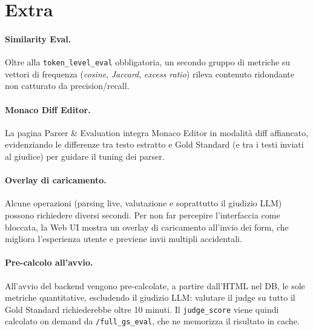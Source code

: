 \documentclass[11pt]{article}
\begin{document}

\section*{Extra}

\paragraph{Similarity Eval.} Oltre alla \texttt{token\_level\_eval} obbligatoria, un secondo gruppo di metriche su vettori di frequenza (\emph{cosine}, \emph{Jaccard}, \emph{excess ratio}) rileva contenuto ridondante non catturato da precision/recall.

\paragraph{Monaco Diff Editor.} La pagina Parser \& Evaluation integra Monaco Editor in modalità diff affiancato, evidenziando le differenze tra testo estratto e Gold Standard (e tra i testi inviati al giudice) per guidare il tuning dei parser.

\paragraph{Overlay di caricamento.} Alcune operazioni (parsing live, valutazione e soprattutto il giudizio LLM) possono richiedere diversi secondi. Per non far percepire l'interfaccia come bloccata, la Web UI mostra un overlay di caricamento all'invio dei form, che migliora l'esperienza utente e previene invii multipli accidentali.

\paragraph{Pre-calcolo all'avvio.} All'avvio del backend vengono pre-calcolate, a partire dall'HTML nel DB, le sole metriche quantitative, escludendo il giudizio LLM: valutare il judge su tutto il Gold Standard richiederebbe oltre 10 minuti. Il \texttt{judge\_score} viene quindi calcolato on demand da \texttt{/full\_gs\_eval}, che ne memorizza il risultato in cache.
\end{document}
